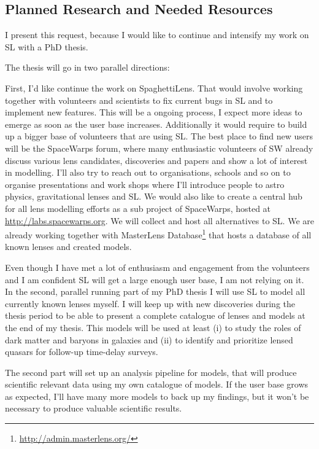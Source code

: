 \documentclass[11pt]{article}
\begin{document}
\subsection{Planned Research and Needed Resources}

I present this request, because I would like to continue and intensify my work on SL with a PhD thesis.

The thesis will go in two parallel directions:

First, I'd like continue the work on SpaghettiLens.
That would involve working together with volunteers and scientists to fix current bugs in SL and to implement new features.
This will be a ongoing process, I expect more ideas to emerge as soon as the user base increases.
Additionally it would require to build up a bigger base of volunteers that are using SL.
The best place to find new users will be the SpaceWarps forum, where many enthusiastic volunteers of SW already discuss various lens candidates, discoveries and papers and show a lot of interest in modelling.
I'll also try to reach out to organisations, schools and so on to organise presentations and work shops where I'll introduce people to astro physics, gravitational lenses and SL.
We would also like to create a central hub for all lens modelling efforts as a sub project of SpaceWarps, hosted at \url{http://labs.spacewarps.org}.
We will collect and host all alternatives to SL.
We are already working together with MasterLens Database\footnote{\url{http://admin.masterlens.org/}} that hosts a database of all known lenses and created models.


Even though I have met a lot of enthusiasm and engagement from the volunteers and I am confident SL will get a large enough user base, I am not relying on it.
In the second, parallel running part of my PhD thesis I will use SL to model all currently known lenses myself.
I will keep up with new discoveries during the thesis period to be able to present a complete catalogue of lenses and models at the end of my thesis.
This models will be used at least (i) to study the roles of dark matter and baryons in galaxies and (ii) to identify and prioritize lensed quasars for follow-up time-delay surveys.

The second part will set up an analysis pipeline for models, that will produce scientific relevant data using my own catalogue of models.
If the user base grows as expected, I'll have many more models to back up my findings, but it won't be necessary to produce valuable scientific results.
\end{document}
